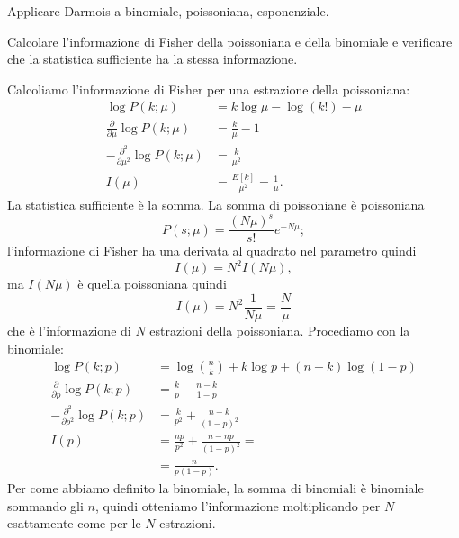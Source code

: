 \begin{exercise}
	Applicare Darmois a binomiale, poissoniana, esponenziale.
\end{exercise}

\begin{exercise}
	Calcolare l'informazione di Fisher della poissoniana e della binomiale e verificare che la statistica sufficiente ha la stessa informazione.
\end{exercise}

\begin{solution}
	Calcoliamo l'informazione di Fisher per una estrazione della poissoniana:
	\begin{align*}
		\log P(k;\mu)
		&= k\log\mu - \log(k!) - \mu \\
		\frac{\partial}{\partial\mu} \log P(k;\mu)
		&= \frac k\mu - 1 \\
		-\frac{\partial^2}{\partial\mu^2} \log P(k;\mu)
		&= \frac k{\mu^2} \\
		I(\mu)
		&= \frac{E[k]}{\mu^2}
		= \frac1\mu.
	\end{align*}
	La statistica sufficiente è la somma.
	La somma di poissoniane è poissoniana
	\begin{equation*}
		P(s;\mu)
		= \frac{(N\mu)^s}{s!}e^{-N\mu};
	\end{equation*}
	l'informazione di Fisher ha una derivata al quadrato nel parametro quindi
	\begin{equation*}
		I(\mu)
		= N^2 I(N\mu),
	\end{equation*}
	ma $I(N\mu)$ è quella poissoniana quindi
	\begin{equation*}
		I(\mu) = N^2 \frac1{N\mu} = \frac N\mu
	\end{equation*}
	che è l'informazione di $N$ estrazioni della poissoniana.
	Procediamo con la binomiale:
	\begin{align*}
		\log P(k;p)
		&= \log\binom nk + k\log p + (n-k)\log(1-p) \\
		\frac{\partial}{\partial p} \log P(k;p)
		&= \frac kp - \frac{n-k}{1-p} \\
		-\frac{\partial^2}{\partial p^2} \log P(k;p)
		&= \frac k{p^2} + \frac{n-k}{(1-p)^2} \\
		I(p)
		&= \frac{np}{p^2} + \frac{n-np}{(1-p)^2} = \\
		&= \frac n{p(1-p)}.
	\end{align*}
	Per come abbiamo definito la binomiale, la somma di binomiali è binomiale sommando gli $n$,
	quindi otteniamo l'informazione moltiplicando per $N$ esattamente come per le $N$ estrazioni.
\end{solution}

